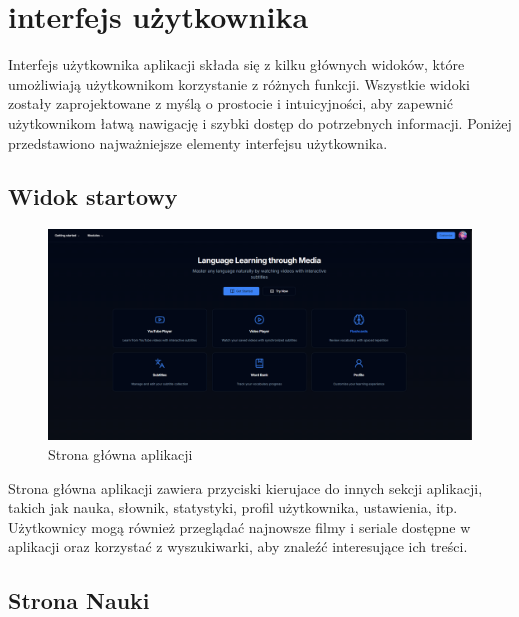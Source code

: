 \section{interfejs użytkownika}
Interfejs użytkownika aplikacji składa się z kilku głównych widoków, które umożliwiają użytkownikom korzystanie z różnych funkcji. Wszystkie widoki zostały zaprojektowane z myślą o prostocie i intuicyjności, aby zapewnić użytkownikom łatwą nawigację i szybki dostęp do potrzebnych informacji. Poniżej przedstawiono najważniejsze elementy interfejsu użytkownika.


\subsection{Widok startowy}

\begin{figure}[H]
    \centering
    \includegraphics[width=1\textwidth]{IMAGE/HomePage.png}
    \caption{Strona główna aplikacji}
    \label{fig:Widok strony głównej aplikacji}
\end{figure}
Strona główna aplikacji zawiera przyciski kierujace do innych sekcji aplikacji, takich jak nauka, słownik, statystyki, profil użytkownika, ustawienia, itp. Użytkownicy mogą również przeglądać najnowsze filmy i seriale dostępne w aplikacji oraz korzystać z wyszukiwarki, aby znaleźć interesujące ich treści.

\subsection{Strona Nauki}

